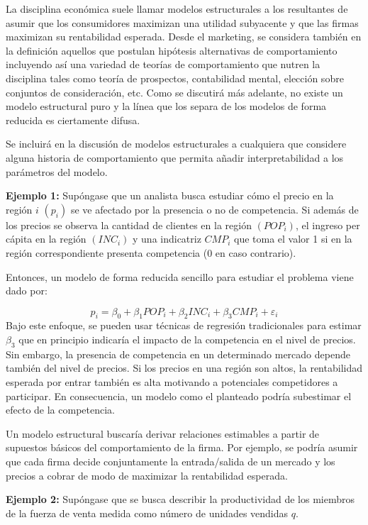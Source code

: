 \documentclass[
]{book}
\begin{document}
La disciplina económica suele llamar modelos estructurales a los resultantes de asumir que los consumidores maximizan una utilidad subyacente y que las firmas maximizan su rentabilidad esperada. Desde el marketing, se considera también en la definición aquellos que postulan hipótesis alternativas de comportamiento incluyendo así una variedad de teorías de comportamiento que nutren la disciplina tales como teoría de prospectos, contabilidad mental, elección sobre conjuntos de consideración, etc. Como se discutirá más adelante, no existe un modelo estructural puro y la línea que los separa de los modelos de forma reducida es ciertamente difusa.

Se incluirá en la discusión de modelos estructurales a cualquiera que considere alguna historia de comportamiento que permita añadir interpretabilidad a los parámetros del modelo.

\textbf{Ejemplo 1:} Supóngase que un analista busca estudiar cómo el precio en la región \(i\) \((p_i)\) se ve afectado por la presencia o no de competencia. Si además de los precios se observa la cantidad de clientes en la región \((POP_i)\), el ingreso per cápita en la región \((INC_i)\) y una indicatriz \(CMP_i\) que toma el valor 1 si en la región correspondiente presenta competencia (0 en caso contrario).

Entonces, un modelo de forma reducida sencillo para estudiar el problema viene dado por:

\[p_i = \beta_0+ \beta_1POP_i + \beta_2INC_i + \beta_3CMP_i + \varepsilon_i\]
Bajo este enfoque, se pueden usar técnicas de regresión tradicionales para estimar \(\beta_3\) que en principio indicaría el impacto de la competencia en el nivel de precios. Sin embargo, la presencia de competencia en un determinado mercado depende también del nivel de precios. Si los precios en una región son altos, la rentabilidad esperada por entrar también es alta motivando a potenciales competidores a participar. En consecuencia, un modelo como el planteado podría subestimar
el efecto de la competencia.

Un modelo estructural buscaría derivar relaciones estimables a partir de supuestos básicos del comportamiento de la firma. Por ejemplo, se podría asumir que cada firma decide conjuntamente la entrada/salida de un mercado y los precios a cobrar de modo de maximizar la rentabilidad esperada.

\textbf{Ejemplo 2:} Supóngase que se busca describir la productividad de los miembros de la fuerza de venta medida como número de unidades vendidas \(q\).
\end{document}
